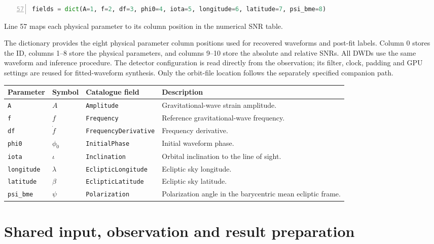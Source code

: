 \documentclass[11pt,a4paper]{article}
\newcommand{\code}[1]{\texttt{\nolinkurl{#1}}}
\begin{document}
\begin{lstlisting}[language=Python,firstnumber=57,numbers=left,showlines=true]
fields = dict(A=1, f=2, df=3, phi0=4, iota=5, longitude=6, latitude=7, psi_bme=8)
\end{lstlisting}

Line 57 maps each physical parameter to its column position in the numerical SNR table.

The dictionary provides the eight physical parameter column positions used for
recovered waveforms and post-fit labels. Column 0 stores the ID, columns 1--8
store the physical parameters, and columns 9--10 store the absolute and relative SNRs. All DWDs use the same waveform and inference
procedure. The detector configuration is read directly from the observation; its filter,
clock, padding and GPU settings are reused for fitted-waveform synthesis.
Only the orbit-file location follows the separately specified companion path.

{\small
\begin{tabularx}{\textwidth}{P{0.14\textwidth}P{0.08\textwidth}P{0.26\textwidth}X}
\toprule Parameter & Symbol & Catalogue field & Description\\\midrule
\code{A} & \(A\) & \code{Amplitude} & Gravitational-wave strain amplitude.\\
\code{f} & \(f\) & \code{Frequency} & Reference gravitational-wave frequency.\\
\code{df} & \(\dot f\) & \code{FrequencyDerivative} & Frequency derivative.\\
\code{phi0} & \(\phi_0\) & \code{InitialPhase} & Initial waveform phase.\\
\code{iota} & \(\iota\) & \code{Inclination} & Orbital inclination to the line of sight.\\
\code{longitude} & \(\lambda\) & \code{EclipticLongitude} & Ecliptic sky longitude.\\
\code{latitude} & \(\beta\) & \code{EclipticLatitude} & Ecliptic sky latitude.\\
\code{psi_bme} & \(\psi\) & \code{Polarization} & Polarization angle in the barycentric mean ecliptic frame.\\
\bottomrule
\end{tabularx}}


\section{Shared input, observation and result preparation}
\label{sec:observation_preparation}
\end{document}
